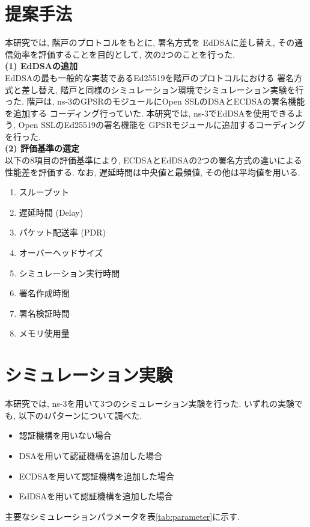 \documentclass[a4j,9pt,twocolumn]{jsarticle}
\begin{document}
\section{提案手法}
\indent 本研究では, 階戸のプロトコル\cite{shinato}をもとに, 署名方式を
EdDSAに差し替え, その通信効率を評価することを目的として, 次の2つのことを行った.\\ 
\noindent\textbf{(1) EdDSAの追加}\\
\indent EdDSAの最も一般的な実装であるEd25519を階戸のプロトコルにおける
署名方式と差し替え, 階戸と同様のシミュレーション環境でシミュレーション実験を行った. 
階戸は, ns-3のGPSRのモジュールにOpen SSLのDSAとECDSAの署名機能を追加する
コーディング行っていた. 本研究では, ns-3でEdDSAを使用できるよう, Open SSLのEd25519の署名機能を
GPSRモジュールに追加するコーディングを行った. \\
\noindent\textbf{(2) 評価基準の選定}\\
\indent 以下の8項目の評価基準により, ECDSAとEdDSAの2つの署名方式の違いによる
性能差を評価する.  なお, 遅延時間は中央値と最頻値, その他は平均値を用いる.
\vspace{-3mm}
\setlength{\columnsep}{10pt} %
\begin{multicols}{2}
    \begin{enumerate}
        \item スループット 
        \item 遅延時間 (Delay)
        \item パケット配送率 (PDR)
        \item オーバーヘッドサイズ\\
        \item シミュレーション実行時間
        \item 署名作成時間
        \item 署名検証時間
        \item メモリ使用量
    \end{enumerate}
\end{multicols}
\vspace{-3mm}
\section{シミュレーション実験}
\indent 本研究では, ns-3を用いて3つのシミュレーション実験を行った.  
いずれの実験でも, 以下の4パターンについて調べた. 
\begin{itemize}
    \item 認証機構を用いない場合
    \item DSAを用いて認証機構を追加した場合
    \item ECDSAを用いて認証機構を追加した場合
    \item EdDSAを用いて認証機構を追加した場合
\end{itemize}
\indent 主要なシミュレーションパラメータを表\ref{tab:parameter}に示す. 
\end{document}
